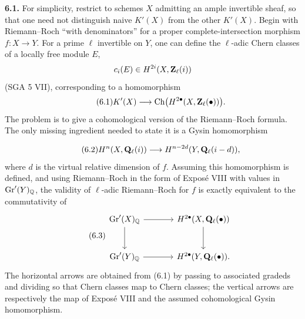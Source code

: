 \textbf{6.1.} For simplicity, restrict to schemes $X$ admitting an ample
invertible sheaf, so that one need not distinguish naive $K'(X)$ from the
other $K'(X)$. Begin with Riemann--Roch ``with denominators'' for a proper
complete-intersection morphism $f:X\to Y$. For a prime $\ell$ invertible on
$Y$, one can define the $\ell$-adic Chern classes of a locally free module
$E$,
\[
 c_i(E)\in H^{2i}(X,\mathbf Z_\ell(i))
\]
(SGA 5 VII), corresponding to a homomorphism
\begin{equation}\tag{6.1}
 K'(X)\longrightarrow\operatorname{Ch}\bigl(H^{2\bullet}(X,\mathbf Z_\ell(\bullet))\bigr).
\end{equation}
The problem is to give a cohomological version of the Riemann--Roch
formula. The only missing ingredient needed to state it is a Gysin
homomorphism

\begin{equation}\tag{6.2}
 H^n(X,\mathbf Q_\ell(i))\longrightarrow H^{n-2d}(Y,\mathbf Q_\ell(i-d)),
\end{equation}
where $d$ is the virtual relative dimension of $f$. Assuming this
homomorphism is defined, and using Riemann--Roch in the form of Exposé VIII
with values in $\operatorname{Gr}'(Y)_\mathbb Q$, the validity of $\ell$-adic
Riemann--Roch for $f$ is exactly equivalent to the commutativity of
\begin{equation}\tag{6.3}
\begin{tikzcd}[column sep=large,row sep=large]
 \operatorname{Gr}'(X)_\Q \arrow[r] \arrow[d]
   & H^{2\bullet}(X,\Qell(\bullet)) \arrow[d] \\
 \operatorname{Gr}'(Y)_\Q \arrow[r]
   & H^{2\bullet}(Y,\Qell(\bullet)).
\end{tikzcd}
\end{equation}
The horizontal arrows are obtained from (6.1) by passing to associated
gradeds and dividing so that Chern classes map to Chern classes; the
vertical arrows are respectively the map of Exposé VIII and the assumed
cohomological Gysin homomorphism.

